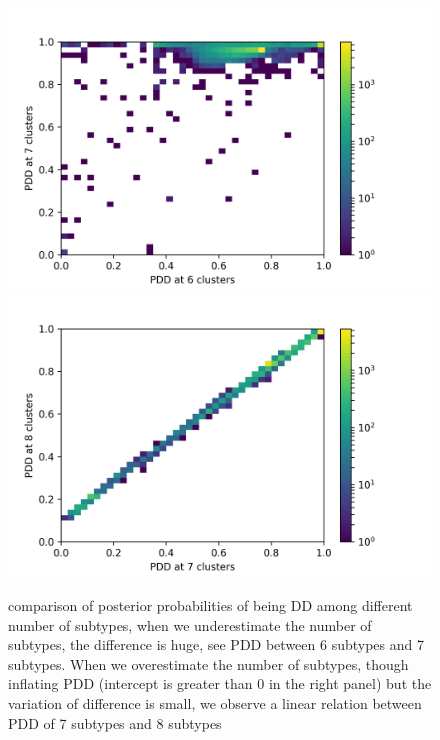 \documentclass[11pt]{amsart}
\begin{document}
\begin{figure}[h]
\vspace{-\parskip}
  \includegraphics[width=\textwidth]{sim_67.png}
\endminipage\hfill
{}
  \includegraphics[width=\textwidth]{sim_78.png}
  \endminipage
\caption{comparison of posterior probabilities of being DD among different number of subtypes, when we underestimate the number of subtypes, the difference is huge, see PDD between 6 subtypes and 7 subtypes. When we overestimate the number of subtypes, though inflating PDD (intercept is greater than 0 in the right panel) but the variation of difference is small, we observe a linear relation between PDD of 7 subtypes and 8 subtypes}
\end{figure}
\end{document}
